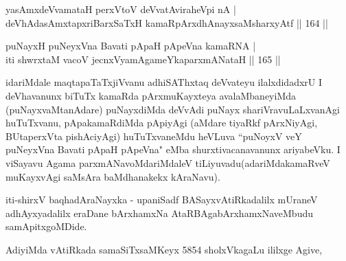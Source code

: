 
\begin{shl}
yasAmxdeVvamataH perxVtoV deVvatAviraheV\s pi nA |\\
deVhAdasAmxtapxriBarxSaTxH kamaRpArxdhAnayxsaMsharxyAtf \hfill || 164 ||
\end{shl}

\begin{shl}
puNayxH puNeyxVna Bavati pApaH pApeVna kamaRNA |\\
iti shwrxtaM vacoV jecnxVyamAgameYkaparxmANataH \hfill || 165 ||
\end{shl}

\begin{artha}
idariMdale maqtapaTaTxjiVvanu adhiSAThxtaq deVvateyu ilalxdidadxrU I deVhavanunx biTuTx kamaRda pArxmuKayxteya avalaMbaneyiMda (puNayxvaMtanAdare) puNayxdiMda deVvAdi puNayx shariVravuLaLxvanAgi huTuTxvanu, pApakamaRdiMda pApiyAgi (aMdare tiyaRkf pArxNiyAgi, BUtaperxVta pishAciyAgi) huTuTxvaneMdu heVLuva ``puNoyxV veY puNeyxVna Bavati pApaH pApeVna" eMba shurxtivacanavanunx ariyabeVku. I viSayavu Agama parxmANavoMdariMdaleV tiLiyuvadu(adariMdakamaRveV muKayxvAgi saMsAra baMdhanakekx kAraNavu).
\end{artha}

\begin{center}
iti-shirxV baqhadAraNayxka - upaniSadf BASayxvAtiRkadalilx mUraneV adhAyxyadalilx eraDane bArxhamxNa AtaRBAgabArxhamxNaveMbudu samApitxgoMDide.
\end{center}

\begin{center}
AdiyiMda vAtiRkada samaSiTxsaMKeyx 5854 sholxVkagaLu ililxge Agive,
\end{center}
